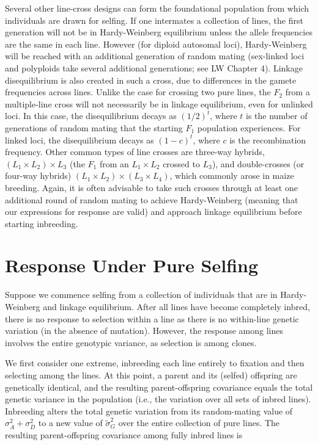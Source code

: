 \documentclass{article}
\begin{document}
Several other line-cross designs can form the foundational population from which individuals are drawn for selfing. If one intermates a collection of lines, the first generation will not be in Hardy-Weinberg equilibrium unless the allele frequencies are the same in each line. However (for diploid autosomal loci), Hardy-Weinberg will be reached with an additional generation of random mating (sex-linked loci and polyploids take several additional generations; see LW Chapter 4). Linkage disequilibrium is also created in such a cross, due to differences in the gamete frequencies across lines. Unlike the case for crossing two pure lines, the  $ F_2 $ from a multiple-line cross will not necessarily be in linkage equilibrium, even for unlinked loci. In this case, the disequilibrium decays as  $ (1/2)^t $, where  $ t $ is the number of generations of random mating that the starting  $ F_1 $ population experiences. For linked loci, the disequilibrium decays as  $ (1 - c)^t $, where  $ c $ is the recombination frequency. Other common types of line crosses are three-way hybrids,  $ (L_1 \times L_2) \times L_3 $ (the  $ F_1 $ from an  $ L_1 \times L_2 $ crossed to  $ L_3 $), and double-crosses (or four-way hybrids)  $ (L_1 \times L_2) \times (L_3 \times L_4) $, which commonly arose in maize breeding. Again, it is often advisable to take such crosses through at least one additional round of random mating to achieve Hardy-Weinberg (meaning that our expressions for response are valid) and approach linkage equilibrium before starting inbreeding.

\section{Response Under Pure Selfing}
Suppose we commence selfing from a collection of individuals that are in Hardy-Weinberg and linkage equilibrium. After all lines have become completely inbred, there is no response to selection within a line as there is no within-line genetic variation (in the absence of mutation). However, the response among lines involves the entire genotypic variance, as selection is among clones.

We first consider one extreme, inbreeding each line entirely to fixation and then selecting among the lines. At this point, a parent and its (selfed) offspring are genetically identical, and the resulting parent-offspring covariance equals the total genetic variance in the population (i.e., the variation over all sets of inbred lines). Inbreeding alters the total genetic variation from its random-mating value of  $ \sigma_A^2 + \sigma_D^2 $ to a new value of  $ \widetilde{\sigma}_G^2 $ over the entire collection of pure lines. The resulting parent-offspring covariance among fully inbred lines is
\end{document}
